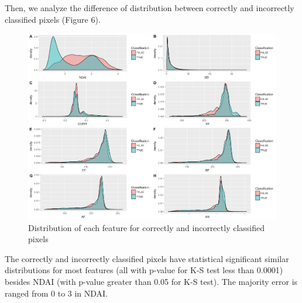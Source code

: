 \documentclass{article}\usepackage[]{graphicx}\usepackage[]{color}
\begin{document}
Then, we analyze the difference of distribution between correctly and incorrectly classified pixels (Figure 6). 

\begin{figure}[h!]
\caption{Distribution of each feature for correctly and incorrectly classified pixels}
\includegraphics[width = \textwidth]{figures/correctanalysis.png}
\end{figure}

The correctly and incorrectly classified pixels have statistical significant similar distributions for most features (all with p-value for K-S test less than 0.0001) besides NDAI (with p-value greater than 0.05 for K-S test). The majority error is ranged from 0 to 3 in NDAI.
\end{document}
